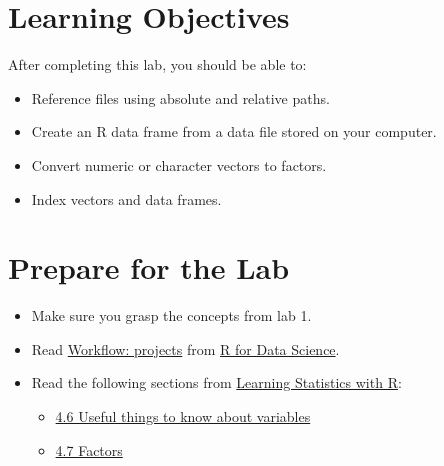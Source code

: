\documentclass[
]{book}
\providecommand{\tightlist}{%
  \setlength{\itemsep}{0pt}\setlength{\parskip}{0pt}}
\begin{document}
\hypertarget{learning-objectives-1}{%
\section{Learning Objectives}\label{learning-objectives-1}}

After completing this lab, you should be able to:

\begin{itemize}
\tightlist
\item
  Reference files using absolute and relative paths.
\item
  Create an R data frame from a data file stored on your computer.
\item
  Convert numeric or character vectors to factors.
\item
  Index vectors and data frames.
\end{itemize}

\hypertarget{prepare-for-the-lab-1}{%
\section{Prepare for the Lab}\label{prepare-for-the-lab-1}}

\begin{itemize}
\tightlist
\item
  Make sure you grasp the concepts from lab 1.
\item
  Read \href{https://r4ds.had.co.nz/workflow-projects.html}{Workflow: projects} from \href{https://r4ds.had.co.nz/}{R for Data Science}.
\item
  Read the following sections from \href{https://learningstatisticswithr.com/}{Learning Statistics with R}:

  \begin{itemize}
  \tightlist
  \item
    \href{https://learningstatisticswithr.com/book/mechanics.html\#useful}{4.6 Useful things to know about variables}
  \item
    \href{https://learningstatisticswithr.com/book/mechanics.html\#factors}{4.7 Factors}
  \end{itemize}
\end{itemize}

  
\end{document}
